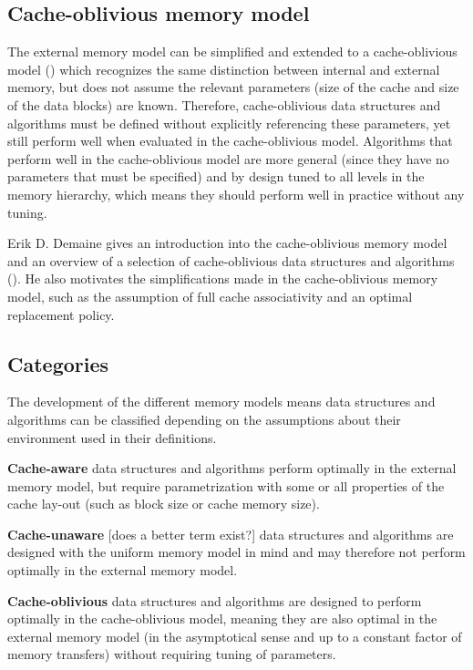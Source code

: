 \documentclass{acm_proc_article-sp}
\begin{document}
\subsection{Cache-oblivious memory model}
The external memory model can be simplified and extended to a cache-oblivious model (\cite{prokop1999coa}) which recognizes the same distinction between internal and external memory, but does not assume the relevant parameters (size of the cache and size of the data blocks) are known. Therefore, cache-oblivious data structures and algorithms must be defined without explicitly referencing these parameters, yet still perform well when evaluated in the cache-oblivious model. Algorithms that perform well in the cache-oblivious model are more general (since they have no parameters that must be specified) and by design tuned to all levels in the memory hierarchy, which means they should perform well in practice without any tuning.

Erik D. Demaine gives an introduction into the cache-oblivious memory model and an overview of a selection of cache-oblivious data structures and algorithms (\cite{demaine2002coa}). He also motivates the simplifications made in the cache-oblivious memory model, such as the assumption of full cache associativity and an optimal replacement policy.

\subsection{Categories}
The development of the different memory models means data structures and algorithms can be classified depending on the assumptions about their environment used in their definitions.
\begin{list}{}{}
\item \textbf{Cache-aware} data structures and algorithms perform optimally in the external memory model, but require parametrization with some or all properties of the cache lay-out (such as block size or cache memory size).
\item \textbf{Cache-unaware} [does a better term exist?] data structures and algorithms  are designed with the uniform memory model in mind and may therefore not perform optimally in the external memory model.
\item \textbf{Cache-oblivious} data structures and algorithms are designed to perform optimally in the cache-oblivious model, meaning they are also optimal in the external memory model (in the asymptotical sense and up to a constant factor of memory transfers) without requiring tuning of parameters.
\end{list}
\end{document}
